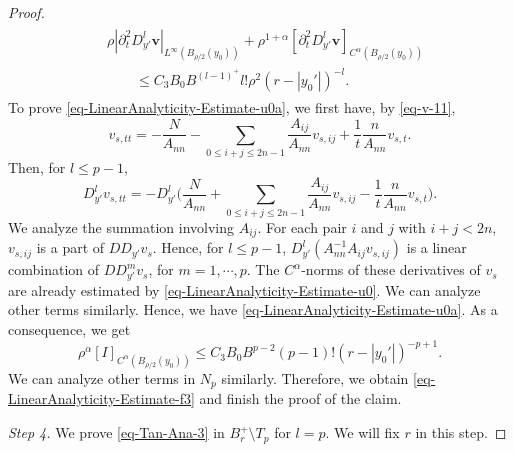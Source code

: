 \documentclass[11pt,reqno]{amsart}
\renewcommand{\leq}{\leqslant}
\theoremstyle{definition}
\numberwithin{equation}{section}
\begin{document}
\begin{proof}
\begin{align}
\begin{split}
&\rho|\partial_t^2D_{y'}^l\mathbf v|_{L^\infty(B_{\rho/2}(y_0))}
+\rho^{1+\alpha}[\partial_t^2D_{y'}^l \mathbf v]_{C^\alpha(B_{\rho/2}(y_0))}\\
&\qquad \leq C_3B_0B^{(l-1)^+}l!\rho^2(r-|y_0'|)^{-l}.
\end{split}\end{align}
To prove \eqref{eq-LinearAnalyticity-Estimate-u0a}, we first have, by 
\eqref{eq-v-11},
\begin{equation}v_{s,tt}=-\frac{N}{A_{nn}}
-\sum_{0\leq i+j\leq 2n-1}\frac{A_{ij}}{A_{nn}}v_{s,ij}+\frac1t\frac{n}{A_{nn}}v_{s,t}
.\end{equation}
Then, for $l\leq p-1$, 
\begin{equation}\label{eq-equation-l}D_{y'}^{l}v_{s,tt}=-D_{y'}^{l}\Big(\frac{N}{A_{nn}}
+\sum_{0\leq i+j\leq 2n-1}\frac{A_{ij}}{A_{nn}}v_{s,ij}-\frac1t\frac{n}{A_{nn}}v_{s,t}
\Big).\end{equation}
We analyze the summation involving $A_{ij}$. 
For each pair $i$ and $j$ with $i+j<2n$, $ v_{s,ij}$ is a part of $DD_{y'}v_s$. 
Hence, for $l\leq p-1$, $D_{y'}^l(A_{nn}^{-1}A_{ij}v_{s,ij})$ is a linear combination of 
$DD_{y'}^m v_s$, for $m=1, \cdots, p$. The $C^\alpha$-norms of these derivatives of $v_s$ 
are already estimated by 
\eqref{eq-LinearAnalyticity-Estimate-u0}. We can analyze other terms similarly. Hence, we have 
\eqref{eq-LinearAnalyticity-Estimate-u0a}. As a consequence, we get 
\begin{equation}
\rho^{\alpha}[I]_{C^\alpha(B_{\rho/2}(y_0))}\leq C_3 B_0B^{p-2}(p-1)!(r-|y_0'|)^{-p+1}.\end{equation}
We can analyze other terms in $N_p$ similarly. Therefore, we obtain
\eqref{eq-LinearAnalyticity-Estimate-f3} and finish the proof of the claim. 


\smallskip

{\it Step 4.} We prove 
\eqref{eq-Tan-Ana-3} in $B^+_r\setminus T_p$ for $l=p$. We will fix $r$ in this step. 


\end{proof}
\end{document}
